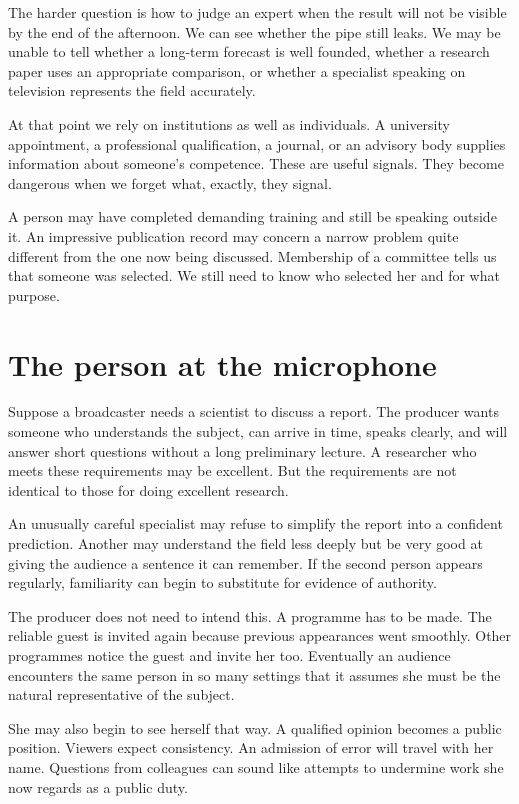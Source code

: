 \documentclass[12pt,a4paper]{book}
\begin{document}
The harder question is how to judge an expert when the result will not be visible by the end of the afternoon. We can see whether the pipe still leaks. We may be unable to tell whether a long-term forecast is well founded, whether a research paper uses an appropriate comparison, or whether a specialist speaking on television represents the field accurately.

At that point we rely on institutions as well as individuals. A university appointment, a professional qualification, a journal, or an advisory body supplies information about someone's competence. These are useful signals. They become dangerous when we forget what, exactly, they signal.

A person may have completed demanding training and still be speaking outside it. An impressive publication record may concern a narrow problem quite different from the one now being discussed. Membership of a committee tells us that someone was selected. We still need to know who selected her and for what purpose.

\section*{The person at the microphone}

Suppose a broadcaster needs a scientist to discuss a report. The producer wants someone who understands the subject, can arrive in time, speaks clearly, and will answer short questions without a long preliminary lecture. A researcher who meets these requirements may be excellent. But the requirements are not identical to those for doing excellent research.

An unusually careful specialist may refuse to simplify the report into a confident prediction. Another may understand the field less deeply but be very good at giving the audience a sentence it can remember. If the second person appears regularly, familiarity can begin to substitute for evidence of authority.

The producer does not need to intend this. A programme has to be made. The reliable guest is invited again because previous appearances went smoothly. Other programmes notice the guest and invite her too. Eventually an audience encounters the same person in so many settings that it assumes she must be the natural representative of the subject.

She may also begin to see herself that way. A qualified opinion becomes a public position. Viewers expect consistency. An admission of error will travel with her name. Questions from colleagues can sound like attempts to undermine work she now regards as a public duty.
\end{document}
